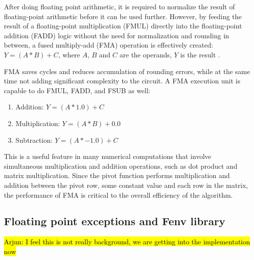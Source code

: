 \documentclass[logo,bsc,singlespacing,parskip]{infthesis}
\newenvironment{compactlist}
{ \begin{enumerate}
    \setlength{\itemsep}{0pt}
    \setlength{\parskip}{0pt}
    \setlength{\parsep}{0pt}     
}
{ \end{enumerate} }
\begin{document}
After doing floating point arithmetic, it is required to normalize the result of
floating-point arithmetic before it can be used further. However, by feeding the
result of a floating-point multiplication (FMUL) directly into the
floating-point addition (FADD) logic without the need for normalization and
rounding in between, a fused multiply-add (FMA) operation is effectively
created: 
\begin{math}Y = (A * B) + C \end{math}, where 
\begin{math}A\end{math},
\begin{math}B\end{math} and
\begin{math}C\end{math} are the operands, 
 \begin{math}Y\end{math} is the result \cite{CARD}.

FMA saves cycles and reduces accumulation of rounding errors, while at the same
time not adding significant complexity to the circuit. A FMA execution unit is
capable to do FMUL, FADD, and FSUB as well: 
\begin{compactlist} 
\item[] Addition: \begin{math}Y = (A * 1.0) + C \end{math} 
\item[] Multiplication: \begin{math} Y = (A * B) + 0.0 \end{math} 
\item[] Subtraction: \begin{math} Y = (A * -1.0) + C\end{math} 
\end{compactlist} 

This is a useful feature in many numerical computations that involve
simultaneous multiplication and addition operations, such as dot product and
matrix multiplication. Since the pivot function performs multiplication and
addition between the pivot row, some constant value and each row in the matrix,
the performance of FMA is critical to the overall efficiency of the algorithm. 

\subsection{Floating point exceptions and Fenv library}
\label{sec:fpe}
\hl{Arjun: I feel this is not really background, we are getting into the implementation now}
\end{document}
